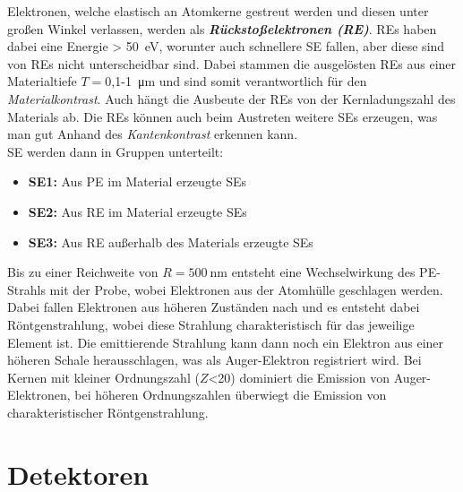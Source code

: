 Elektronen, welche elastisch an Atomkerne gestreut werden und diesen unter großen Winkel verlassen, werden als \textbf{\textit{Rückstoßelektronen (RE)}}. REs haben dabei eine Energie > \SI{50}{\electronvolt}, worunter auch schnellere SE fallen, aber diese sind von REs nicht unterscheidbar sind. Dabei stammen die ausgelösten REs aus einer Materialtiefe $T=$0,1-\SI{1}{\micro\metre} und sind somit verantwortlich für den \textit{Materialkontrast}. Auch hängt die Ausbeute der REs von der Kernladungszahl des Materials ab. \citep{RasterEM} \citep{WikipolyREM} Die REs können auch beim Austreten weitere SEs erzeugen, was man gut Anhand des \textit{Kantenkontrast} erkennen kann. \citep{RasterEM} \\

SE werden dann in Gruppen unterteilt:
\begin{itemize}
    \item \textbf{SE1:} Aus PE im Material erzeugte SEs
    \item \textbf{SE2:} Aus RE im Material erzeugte SEs 
    \item \textbf{SE3:} Aus RE außerhalb des Materials erzeugte SEs\\   
\end{itemize}

Bis zu einer Reichweite von $R=\SI{500}{\nano\metre}$ entsteht eine Wechselwirkung des PE-Strahls mit der Probe, wobei Elektronen aus der Atomhülle geschlagen werden. Dabei fallen Elektronen aus höheren Zuständen nach und es entsteht dabei Röntgenstrahlung, wobei diese Strahlung charakteristisch für das jeweilige Element ist. Die emittierende Strahlung kann dann noch ein Elektron aus einer höheren Schale herausschlagen, was als Auger-Elektron registriert wird. Bei Kernen mit kleiner Ordnungszahl ($Z$<20) dominiert die Emission von Auger-Elektronen, bei
höheren Ordnungszahlen überwiegt die Emission von charakteristischer Röntgenstrahlung.

\section{Detektoren}
\label{sec:detect}

